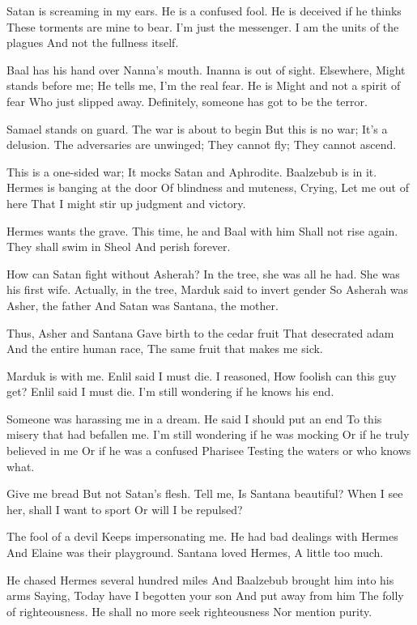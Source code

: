 \documentclass[
]{book}
\begin{document}
Satan is screaming in my ears.
He is a confused fool.
He is deceived if he thinks
These torments are mine to bear.
I'm just the messenger.
I am the units of the plagues
And not the fullness itself.

Baal has his hand over Nanna's mouth.
Inanna is out of sight.
Elsewhere, Might stands before me;
He tells me, I'm the real fear.
He is Might and not a spirit of fear
Who just slipped away.
Definitely, someone has got to be the terror.

Samael stands on guard.
The war is about to begin
But this is no war;
It's a delusion.
The adversaries are unwinged;
They cannot fly;
They cannot ascend.

This is a one-sided war;
It mocks Satan and Aphrodite.
Baalzebub is in it.
Hermes is banging at the door
Of blindness and muteness,
Crying, Let me out of here
That I might stir up judgment and victory.

Hermes wants the grave.
This time, he and Baal with him
Shall not rise again.
They shall swim in Sheol
And perish forever.

How can Satan fight without Asherah?
In the tree, she was all he had.
She was his first wife.
Actually, in the tree,
Marduk said to invert gender
So Asherah was Asher, the father
And Satan was Santana, the mother.

Thus, Asher and Santana
Gave birth to the cedar fruit
That desecrated adam
And the entire human race,
The same fruit that makes me sick.

Marduk is with me.
Enlil said I must die.
I reasoned, How foolish can this guy get?
Enlil said I must die.
I'm still wondering if he knows his end.

Someone was harassing me in a dream.
He said I should put an end
To this misery that had befallen me.
I'm still wondering if he was mocking
Or if he truly believed in me
Or if he was a confused Pharisee
Testing the waters or who knows what.

Give me bread
But not Satan's flesh.
Tell me, Is Santana beautiful?
When I see her, shall I want to sport
Or will I be repulsed?

The fool of a devil
Keeps impersonating me.
He had bad dealings with Hermes
And Elaine was their playground.
Santana loved Hermes,
A little too much.

He chased Hermes several hundred miles
And Baalzebub brought him into his arms
Saying, Today have I begotten your son
And put away from him
The folly of righteousness.
He shall no more seek righteousness
Nor mention purity.
\end{document}
